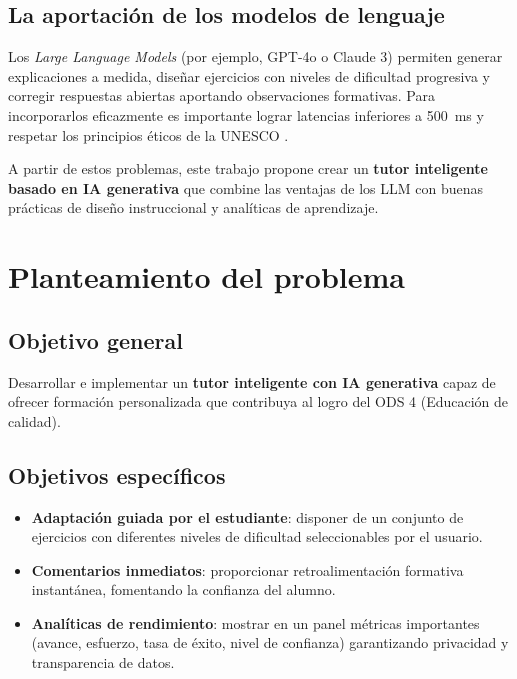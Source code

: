 \subsection*{La aportación de los modelos de lenguaje}

Los \emph{Large Language Models} (por ejemplo, GPT-4o o Claude 3) permiten generar explicaciones a medida, diseñar ejercicios con niveles de dificultad progresiva y corregir respuestas abiertas aportando observaciones formativas. Para incorporarlos eficazmente es importante lograr latencias inferiores a \SI{500}{ms} \cite{Kramer2024} y respetar los principios éticos de la UNESCO \cite{UNESCO2021,UNESCO2023}.

\bigskip
\noindent
A partir de estos problemas, este trabajo propone crear un \textbf{tutor inteligente basado en IA generativa} que combine las ventajas de los LLM con buenas prácticas de diseño instruccional y analíticas de aprendizaje.

\section{Planteamiento del problema}

\subsection*{Objetivo general}

Desarrollar e implementar un \textbf{tutor inteligente con IA generativa} capaz de ofrecer formación personalizada que contribuya al logro del ODS 4 (Educación de calidad).

\subsection*{Objetivos específicos}

\begin{itemize}[leftmargin=*]
  \item \textbf{Adaptación guiada por el estudiante}: disponer de un conjunto de ejercicios con diferentes niveles de dificultad seleccionables por el usuario.  
  \item \textbf{Comentarios inmediatos}: proporcionar retroalimentación formativa instantánea, fomentando la confianza del alumno.  
  \item \textbf{Analíticas de rendimiento}: mostrar en un panel métricas importantes (avance, esfuerzo, tasa de éxito, nivel de confianza) garantizando privacidad y transparencia de datos.
\end{itemize}

